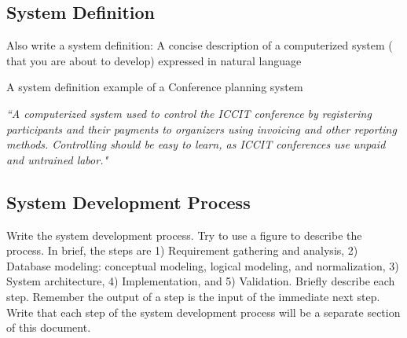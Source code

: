 \subsection{System Definition}\label{subsec:sd} 
Also write a system definition: A concise description of a computerized system ( that you are about to develop) expressed in natural language

A system definition example of a Conference planning system

\textit{``A computerized system used to control the ICCIT conference by registering participants and their payments to organizers using invoicing and other reporting methods. Controlling should be easy to learn, as ICCIT conferences use unpaid and untrained labor."}


\subsection{System Development Process}\label{subsec:sdp}
Write the system development process. Try to use a figure to describe the process. In brief, the  steps are 1) Requirement gathering and analysis, 2) Database modeling: conceptual modeling, logical modeling, and normalization, 3) System architecture, 4) Implementation, and 5) Validation. Briefly describe each step. Remember the output of a step is the  input of the immediate next step. Write that each step of the system development process will be a separate section of this document.
\begin{comment}


To design a database, one should follow the following steps:
\begin{enumerate}
\item Requirement analysis
	\begin{itemize}
		\item[-] interviewing, documentation, etc .
	\end{itemize}

\item Mapping onto a conceptual model (conceptual design)
     \begin{itemize}
     	\item[-] ER model
     \end{itemize}
\item Mapping onto a data model (logical design)
	\begin{itemize}
     	\item[-] Relational model, object model etc. 
     \end{itemize}
\item Normalization
\item System Architecture
\item Realization and Implementation (physical design)    
    
\end{enumerate}
\end{comment}


